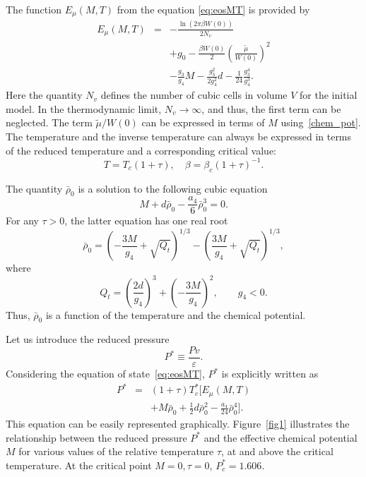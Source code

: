 \documentclass[fleqn,twoside,twocolumn,nofootinbib,showkeys]{revtex4} %
\begin{document}
	The function $E_\mu(M, T)$ from the equation \eqref{eq:eosMT} is provided by
	\begin{eqnarray}\label{eq:E_mu}
		E_\mu (M, T) & = & - \frac{\ln (2\pi \beta W(0))}{2 N_v}  
		\nonumber\\
		&& +  g_0 - \frac{\beta W(0)}{2} 
		\left(\frac{\tilde\mu}{W(0)} \right)^{2} 
		\nonumber\\
		&& - \frac{g_3}{g_4} {M} \! - \frac{g_3^2}{2 g_4^2}  d - \frac{1}{24} \frac{g_3^4}{g_4^3}. 
	\end{eqnarray}
	Here the quantity $N_v$ defines the number of cubic cells in volume $V$ for the initial model.
	In the thermodynamic limit, $N_v \to \infty$, and thus, the first term can be neglected. The term $\tilde{\mu}/W(0)$ can be expressed in terms of $M$ using~\eqref{chem_pot}. The temperature and the inverse temperature can always be expressed in terms of the reduced temperature and a corresponding critical value:
	\begin{equation*}
		T = T_c(1+\tau), \quad \beta = \beta_c (1 + \tau)^{-1}.
	\end{equation*} 
	
	The quantity $\bar{\rho}_0$ is a solution to the following cubic equation
	\begin{equation}\label{eq:ro_M}
		M + d \bar\rho_0 - \frac{a_4}{6} \bar\rho_0^3 = 0.
	\end{equation}
	For any $\tau > 0$, the latter equation has one real root
	\begin{equation}\label{eq:ro_MT}
		\bar \rho_0 = \left(- \frac{3 M}{g_4} + \sqrt{Q_t}\right)^{1/3} - \left(  \frac{3 M}{g_4} + \sqrt{Q_t} \right)^{1/3},
	\end{equation}
	where
	\begin{equation}
		Q_t = \left(  \frac{2d}{g_4}\right)^3 + \left( -\frac{3 M}{g_4}\right)^2, \qquad g_4<0.
	\end{equation}
	Thus, $\bar{\rho}_0$ is a function of the temperature and the chemical potential.
	
	Let us introduce the reduced pressure
	\begin{equation}
		\label{def:reduced_pres}
		P^* \equiv \frac{P v}{\varepsilon}.
	\end{equation}
	Considering the equation of state~\eqref{eq:eosMT}, $P^*$ is explicitly written as
	\begin{eqnarray}
		\label{eq:eosPTM_reduced}
		P^* & = & (1 + \tau)T^*_c \bigg[ E_\mu(M, T) 
		\nonumber\\
		&& + M \bar \rho_0 + \frac{1}{2} d \bar \rho_0^2 - \frac{a_4}{24} \bar \rho_0^4
		\bigg].
	\end{eqnarray}
	This equation can be easily represented graphically. Figure~\ref{fig1} illustrates the relationship between the reduced pressure $P^*$ and the effective chemical potential $M$ for various values of the relative temperature $\tau$, at and above the critical temperature. At the critical point $M=0, \tau=0$, $P^*_c = 1.606$. 
	
\end{document}
